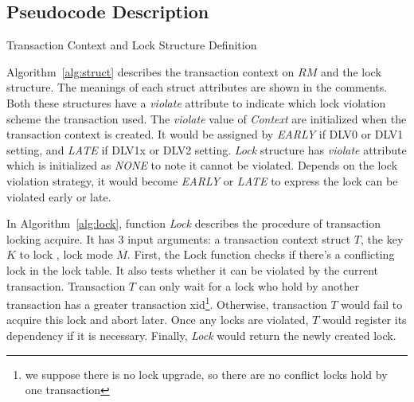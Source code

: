 \documentclass[conference]{IEEEtran}
\begin{document}

\subsection{Pseudocode Description}

\begin{algorithm}
  \caption{Transaction Context and Lock Structure Definition}
  \label{alg:struct}

\end{algorithm}

Algorithm~\ref{alg:struct} describes the transaction context on ${RM}$ and the lock structure.
The meanings of each struct attributes are shown in the comments.
Both these structures have a \emph{violate} attribute to indicate which lock violation scheme the transaction used.
The \emph{violate} value of \emph{Context} are initialized when the transaction context is created.
It would be assigned by \emph{EARLY} if DLV0 or DLV1 setting, and \emph{LATE} if DLV1x or DLV2 setting.
\emph{Lock} structure has \emph{violate} attribute which is initialized as \emph{NONE} to note it cannot be violated.
Depends on the lock violation strategy, it would become \emph{EARLY} or \emph{LATE} to express the lock can be violated early or late.

In Algorithm~\ref{alg:lock},  function \emph{Lock} describes the procedure of transaction locking acquire.
It has 3 input arguments: a transaction context struct ${T}$, the key ${K}$ to lock , lock mode ${M}$.
First, the Lock function checks if there's a conflicting lock in the lock table.
It also tests whether it can be violated by the current transaction.
Transaction ${T}$ can only wait for a lock who hold by another transaction has a greater transaction xid\footnote{we suppose there is no lock upgrade, so there are no conflict locks hold by one transaction}.
Otherwise, transaction ${T}$ would fail to acquire this lock and abort later.
Once any locks are violated, 
${T}$ would register its dependency if it is necessary. 
Finally, \emph{Lock} would return the newly created lock.
\end{document}

